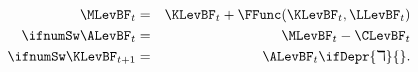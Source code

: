 \begin{eqnarray*}
    \MLevBF_{t}  & = & \KLevBF_{t}+\FFunc(\KLevBF_{t},\LLevBF_{t}) \label{eq:TransitionDSGE}
\\ \ifnumSw  \ALevBF_{t}  & = & \MLevBF_{t}-\CLevBF_{t}
\\ \ifnumSw  \KLevBF_{t+1} & = & \ALevBF_{t}  \ifDepr{\daleth}{}.
\end{eqnarray*}
